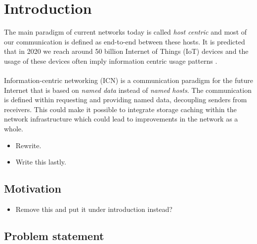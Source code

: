 \section{Introduction}
The main paradigm of current networks today is called  \textit{host centric} and most of our communication is defined as end-to-end between these hosts. It is predicted that in 2020 we reach around 50 billion Internet of Things (IoT) devices \cite{alanCarlton} and the usage of these devices often imply information centric usage patterns \cite{Ahlgren2012}.
\\\\
Information-centric networking (ICN) is a communication paradigm for the future Internet that is based on \textit{named data} instead of \textit{named hosts}. The communication is defined within requesting and providing named data, decoupling senders from receivers. This could make it possible to integrate storage caching within the network infrastructure \cite{Ahlgren2012} which could lead to improvements in the network as a whole.

\begin{itemize}
	\item Rewrite.
	\item Write this lastly.
\end{itemize}



\subsection{Motivation}
\begin{itemize}
	\item Remove this and put it under introduction instead?
\end{itemize}

\subsection{Problem statement}

